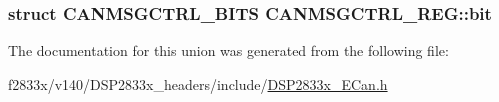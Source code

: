 \subsubsection[{bit}]{\setlength{\rightskip}{0pt plus 5cm}struct {\bf C\+A\+N\+M\+S\+G\+C\+T\+R\+L\+\_\+\+B\+I\+T\+S} C\+A\+N\+M\+S\+G\+C\+T\+R\+L\+\_\+\+R\+E\+G\+::bit}\label{union_c_a_n_m_s_g_c_t_r_l___r_e_g_a8cb5d3114578fc67982fc440b7fcd32a}


The documentation for this union was generated from the following file\+:\begin{DoxyCompactItemize}
\item 
f2833x/v140/\+D\+S\+P2833x\+\_\+headers/include/\hyperlink{_d_s_p2833x___e_can_8h}{D\+S\+P2833x\+\_\+\+E\+Can.\+h}\end{DoxyCompactItemize}
